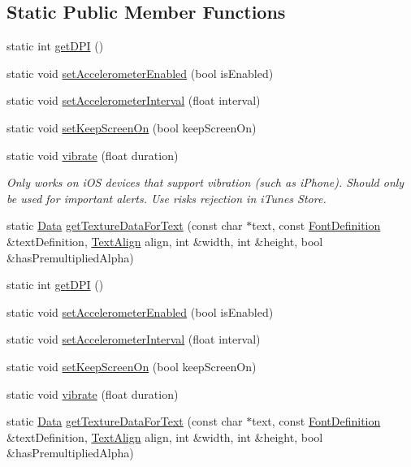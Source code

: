 \subsection*{Static Public Member Functions}
\begin{DoxyCompactItemize}
\item 
static int \hyperlink{classDevice_ad86cb1da9223c0c54ddbf13fa25d74bb}{get\+D\+PI} ()
\item 
static void \hyperlink{classDevice_ac988691d36ced3bafec35d0f8f41ebb3}{set\+Accelerometer\+Enabled} (bool is\+Enabled)
\item 
static void \hyperlink{classDevice_a9dfd86f9b58de0b39b4de5bdef7ba0d8}{set\+Accelerometer\+Interval} (float interval)
\item 
static void \hyperlink{classDevice_a8c6700b3face65a74c38a231efda75c4}{set\+Keep\+Screen\+On} (bool keep\+Screen\+On)
\item 
static void \hyperlink{classDevice_afc60a7897697cbc80d90a017661b0a3b}{vibrate} (float duration)
\begin{DoxyCompactList}\small\item\em Only works on i\+OS devices that support vibration (such as i\+Phone). Should only be used for important alerts. Use risks rejection in i\+Tunes Store. \end{DoxyCompactList}\item 
static \hyperlink{classData}{Data} \hyperlink{classDevice_a5f31fe5af17abb0fa201169eff7ee8a7}{get\+Texture\+Data\+For\+Text} (const char $\ast$text, const \hyperlink{structFontDefinition}{Font\+Definition} \&text\+Definition, \hyperlink{classDevice_a62f8577d4803c8fce764f7cdff2abe92}{Text\+Align} align, int \&width, int \&height, bool \&has\+Premultiplied\+Alpha)
\item 
static int \hyperlink{classDevice_a2d54634bb1cb52d1d937716e6046fab7}{get\+D\+PI} ()
\item 
static void \hyperlink{classDevice_a0a2adf1ca94fcc83246fbc675c15874f}{set\+Accelerometer\+Enabled} (bool is\+Enabled)
\item 
static void \hyperlink{classDevice_a787d692ed935080302741b1e85f3bdb5}{set\+Accelerometer\+Interval} (float interval)
\item 
static void \hyperlink{classDevice_aca10bab0f588d97ccd65c602f7bc70e0}{set\+Keep\+Screen\+On} (bool keep\+Screen\+On)
\item 
static void \hyperlink{classDevice_ad8eae45743df465d662b63d2282c0ccd}{vibrate} (float duration)
\item 
static \hyperlink{classData}{Data} \hyperlink{classDevice_ad52511a8322890c713f87457bfef4840}{get\+Texture\+Data\+For\+Text} (const char $\ast$text, const \hyperlink{structFontDefinition}{Font\+Definition} \&text\+Definition, \hyperlink{classDevice_a62f8577d4803c8fce764f7cdff2abe92}{Text\+Align} align, int \&width, int \&height, bool \&has\+Premultiplied\+Alpha)
\end{DoxyCompactItemize}


